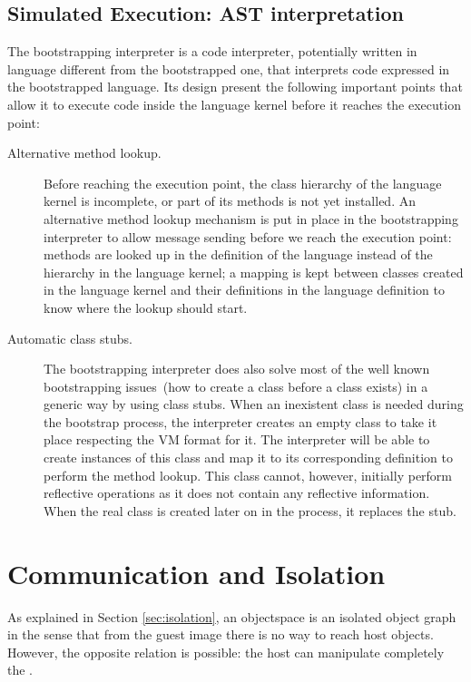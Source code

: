 \subsection{Simulated Execution: AST interpretation}

The bootstrapping interpreter is a code interpreter, potentially written in language different from the bootstrapped one, that interprets code expressed in the bootstrapped language. Its design present the following important points that allow it to execute code inside the language kernel before it reaches the execution point:

\begin{description}
\item[Alternative method lookup.] Before reaching the execution point, the class hierarchy of the language kernel is incomplete, or part of its methods is not yet installed. An alternative method lookup mechanism is put in place in the bootstrapping interpreter to allow message sending before we reach the execution point: methods are looked up in the definition of the language instead of the hierarchy in the language kernel; a mapping is kept between classes created in the language kernel and their definitions in the language definition to know where the lookup should start.

\item[Automatic class stubs.] The bootstrapping interpreter does also solve most of the well known bootstrapping issues~(\eg how to create a class before a class exists) in a generic way by using class stubs. When an inexistent class is needed during the bootstrap process, the interpreter creates an empty class to take it place respecting the VM format for it. The interpreter will be able to create instances of this class and map it to its corresponding definition to perform the method lookup. This class cannot, however, initially perform reflective operations as it does not contain any reflective information. When the real class is created later on in the process, it replaces the stub.
\end{description}

\section{Communication and Isolation} \label{sec:communication}\label{sec:isolation}


As explained in Section \ref{sec:isolation}, an objectspace is an isolated object graph in the sense that from the guest image there is no way to reach host objects. However, the opposite relation is possible: the host can manipulate completely the \objectspace.


